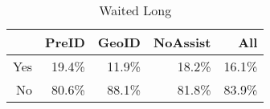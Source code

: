 \begin{table}[ht]
\centering
\begin{tabular}{rrrrr}
  \hline
 & PreID & GeoID & NoAssist & All \\ 
  \hline
Yes & 19.4\% & 11.9\% & 18.2\% & 16.1\% \\ 
  No & 80.6\% & 88.1\% & 81.8\% & 83.9\% \\ 
   \hline
\end{tabular}
\caption{Waited Long} 
\end{table}
